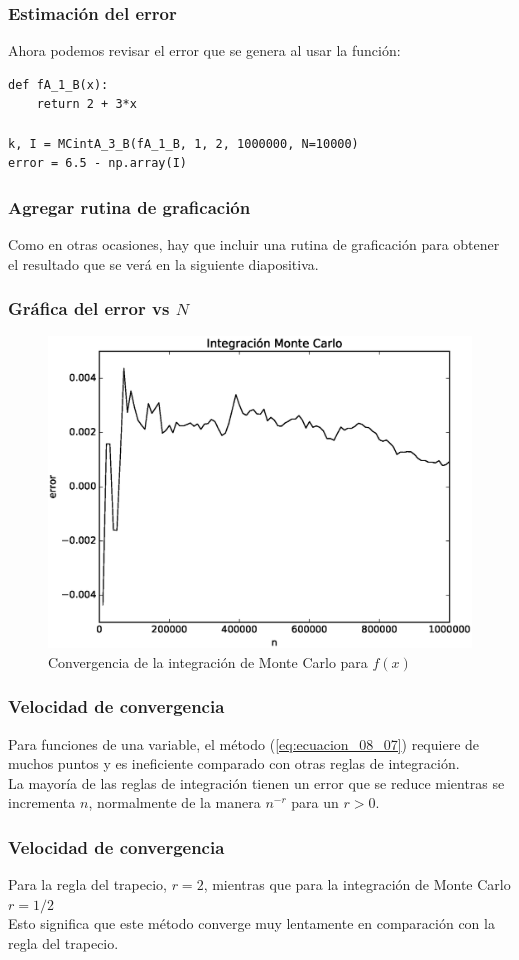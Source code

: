 \begin{frame}
\frametitle{Estimación del error}
Ahora podemos revisar el error que se genera al usar la función:
\begin{lstlisting}[caption=Estimación del error del procedimiento, style=codigopython]
def fA_1_B(x):
    return 2 + 3*x

k, I = MCintA_3_B(fA_1_B, 1, 2, 1000000, N=10000)
error = 6.5 - np.array(I)
\end{lstlisting}
\end{frame}
\begin{frame}
\frametitle{Agregar rutina de graficación}
Como en otras ocasiones, hay que incluir una rutina de graficación para obtener el resultado que se verá en la siguiente diapositiva. 
\end{frame}
\begin{frame}[fragile]
\frametitle{Gráfica del error vs $N$}
\begin{figure}
	\centering
	\includegraphics[scale=0.5]{Imagenes/integracionMC01.eps}
	\caption{Convergencia de la integración de Monte Carlo para $f(x)$}
\end{figure}
\end{frame}
\begin{frame}
\frametitle{Velocidad de convergencia}
Para funciones de una variable, el método (\ref{eq:ecuacion_08_07}) requiere de muchos puntos y es ineficiente comparado con otras reglas de integración.
\\
\bigskip
La mayoría de las reglas de integración tienen un error que se reduce mientras se incrementa $n$, normalmente de la manera $n^{-r}$ para un $r>0$.
\end{frame}
\begin{frame}
\frametitle{Velocidad de convergencia}
Para la regla del trapecio, $r = 2$, mientras que para la integración de Monte Carlo $r = 1/2$
\\
\bigskip
Esto significa que este método converge muy lentamente en comparación con la regla del trapecio.
\end{frame}
